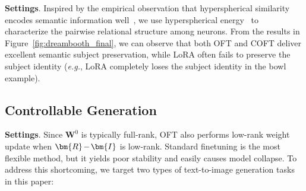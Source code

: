 \begin{itemize}[leftmargin=*,nosep]
\textbf{Settings}. Inspired by the empirical observation that hyperspherical similarity encodes semantic information well~\cite{liu2017deep,liu2018decoupled,chen2020angular}, we use hyperspherical energy~\cite{liu2018learning} to characterize the pairwise relational structure among neurons. From the results in Figure~\ref{fig:dreambooth_final}, we can observe that both OFT and COFT deliver excellent semantic subject preservation, while LoRA often fails to preserve the subject identity (\emph{e.g.}, LoRA completely loses the subject identity in the bowl example). \subsection{Controllable Generation}

\textbf{Settings}. Since $\bm{W}^0$ is typically full-rank, OFT also performs low-rank weight update when $\thickmuskip=2mu \medmuskip=2mu \bm{R}-\bm{I}$ is low-rank. Standard finetuning is the most flexible method, but it yields poor stability and easily causes model collapse. To address this shortcoming, we target two types of text-to-image generation tasks in this paper:

\begin{itemize}[leftmargin=*,nosep]


\end{itemize}
\end{itemize}
